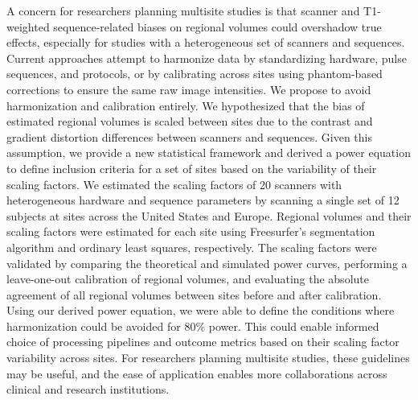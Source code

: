 
A concern for researchers planning multisite studies is that scanner and T1-weighted sequence-related biases on regional volumes could overshadow true effects, especially for studies with a heterogeneous set of scanners and sequences. Current approaches attempt to harmonize data by standardizing hardware, pulse sequences, and protocols, or by calibrating across sites using phantom-based corrections to ensure the same raw image intensities. We propose to avoid harmonization and calibration entirely.  We hypothesized that the bias of estimated regional volumes is scaled between sites due to the contrast and gradient distortion differences between scanners and sequences. Given this assumption, we provide a new statistical framework and derived a power equation to define inclusion criteria for a set of sites based on the variability of their scaling factors. We estimated the scaling factors of 20 scanners with heterogeneous hardware and sequence parameters by scanning a single set of 12 subjects at sites across the United States and Europe. Regional volumes and their scaling factors were estimated for each site using Freesurfer's segmentation algorithm and ordinary least squares, respectively. The scaling factors were validated by comparing the theoretical and simulated power curves, performing a leave-one-out calibration of regional volumes, and evaluating the absolute agreement of all regional volumes between sites before and after calibration. Using our derived power equation, we were able to define the conditions where harmonization could be avoided for 80\% power. This could enable informed choice of processing pipelines and outcome metrics based on their scaling factor variability across sites. For researchers planning multisite studies, these guidelines may be useful, and the ease of application enables more collaborations across clinical and research institutions.